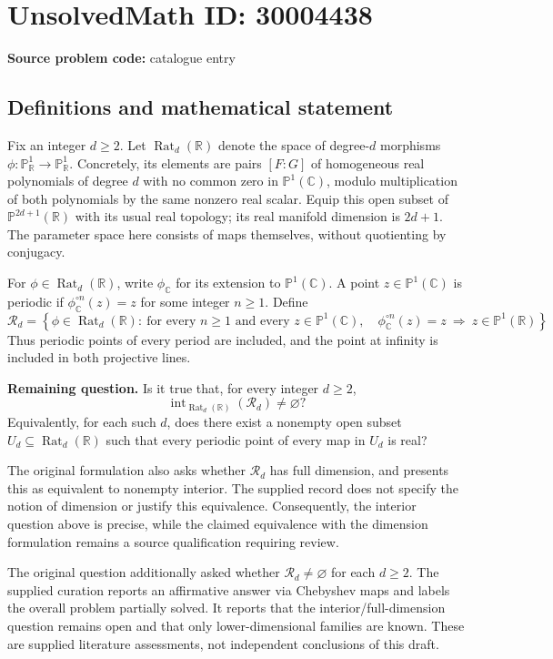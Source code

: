 \documentclass[11pt]{article}
\newcommand{\R}{\mathbb{R}}
\newcommand{\C}{\mathbb{C}}
\newcommand{\PP}{\mathbb{P}}
\begin{document}
\section*{UnsolvedMath ID: 30004438}
\textbf{Source problem code:} catalogue entry
\subsection{Definitions and mathematical statement}
Fix an integer \(d\geq 2\). Let \(\operatorname{Rat}_d(\R)\) denote the space of degree-\(d\) morphisms \(\phi:\PP^1_{\R}\to\PP^1_{\R}\). Concretely, its elements are pairs \([F:G]\) of homogeneous real polynomials of degree \(d\) with no common zero in \(\PP^1(\C)\), modulo multiplication of both polynomials by the same nonzero real scalar. Equip this open subset of \(\PP^{2d+1}(\R)\) with its usual real topology; its real manifold dimension is \(2d+1\). The parameter space here consists of maps themselves, without quotienting by conjugacy.

For \(\phi\in\operatorname{Rat}_d(\R)\), write \(\phi_{\C}\) for its extension to \(\PP^1(\C)\). A point \(z\in\PP^1(\C)\) is periodic if \(\phi_{\C}^{\circ n}(z)=z\) for some integer \(n\geq1\). Define
\[
\mathcal R_d=\left\{\phi\in\operatorname{Rat}_d(\R):\ \text{for every }n\geq1\text{ and every }z\in\PP^1(\C),\quad \phi_{\C}^{\circ n}(z)=z\ \Longrightarrow\ z\in\PP^1(\R)\right\}.
\]
Thus periodic points of every period are included, and the point at infinity is included in both projective lines.

\textbf{Remaining question.} Is it true that, for every integer \(d\geq2\),
\[
\operatorname{int}_{\operatorname{Rat}_d(\R)}(\mathcal R_d)\neq\varnothing?
\]
Equivalently, for each such \(d\), does there exist a nonempty open subset \(U_d\subseteq\operatorname{Rat}_d(\R)\) such that every periodic point of every map in \(U_d\) is real?

The original formulation also asks whether \(\mathcal R_d\) has full dimension, and presents this as equivalent to nonempty interior. The supplied record does not specify the notion of dimension or justify this equivalence. Consequently, the interior question above is precise, while the claimed equivalence with the dimension formulation remains a source qualification requiring review.

The original question additionally asked whether \(\mathcal R_d\neq\varnothing\) for each \(d\geq2\). The supplied curation reports an affirmative answer via Chebyshev maps and labels the overall problem partially solved. It reports that the interior/full-dimension question remains open and that only lower-dimensional families are known. These are supplied literature assessments, not independent conclusions of this draft.
\end{document}
